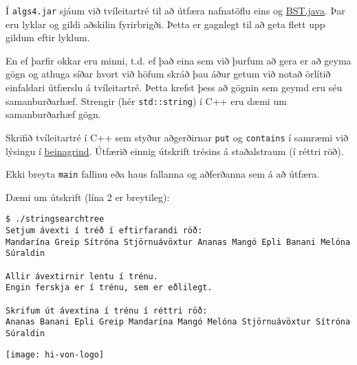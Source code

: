 \documentclass{article}
\begin{document}
\newpage

\question

Í \texttt{algs4.jar} sjáum við tvíleitartré til að útfæra nafnatöflu eins og \href{https://algs4.cs.princeton.edu/code/edu/princeton/cs/algs4/BST.java.html}{BST.java}. Þar eru lyklar  og gildi  aðskilin fyrirbrigði. Þetta er gagnlegt til að geta flett upp gildum eftir lyklum.

En ef þarfir okkar eru minni, t.d. ef það eina sem við þurfum að gera er að geyma gögn og athuga síðar hvort við höfum skráð þau áður getum við notað örlítið einfaldari útfærslu á tvíleitartré. Þetta krefst þess að gögnin sem geymd eru séu samanburðarhæf. Strengir (hér \texttt{std::string}) í C++ eru dæmi um samanburðarhæf gögn. 

Skrifið tvíleitartré í C++ sem styður aðgerðirnar \texttt{put} og \texttt{contains} í samræmi við lýsingu í \href{https://github.com/Ernir/kennsluefni/tree/master/T2/Code/w8/stringsearchtree.cpp}{beinagrind}. Útfærið einnig útskrift trésins á staðalstraum (í réttri röð).

Ekki breyta \texttt{main} fallinu eða haus fallanna og aðferðanna sem á að útfæra. 

Dæmi um útskrift (lína 2 er breytileg):
\begin{verbatim}
$ ./stringsearchtree
Setjum ávexti í tréð í eftirfarandi röð:
Mandarína Greip Sítróna Stjörnuávöxtur Ananas Mangó Epli Banani Melóna Súraldin

Allir ávextirnir lentu í trénu.
Engin ferskja er í trénu, sem er eðlilegt.

Skrifum út ávextina í trénu í réttri röð:
Ananas Banani Epli Greip Mandarína Mangó Melóna Stjörnuávöxtur Sítróna Súraldin
\end{verbatim}

\vfill
\texttt{[image: hi-von-logo]}
\end{document}
